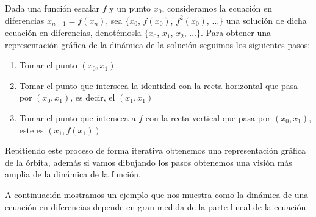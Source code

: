 \documentclass[12pt,a4paper]{report}
\theoremstyle{definition}
\begin{document}
Dada una función escalar $f$ y un punto $x_0$, consideramos la ecuación en diferencias $x_{n+1} = f(x_n)$, sea $\{ x_0$, $f(x_0)$, $f^2(x_0)$, $\ldots \}$ una solución de dicha ecuación en diferencias, denotémosla $ \{ x_0$, $x_1$, $x_2 $, $\ldots \}$. Para obtener una  representación gráfica de la dinámica de la solución seguimos los siguientes pasos:

\begin{enumerate}
    \item Tomar el punto $(x_0,x_1)$.
    \item Tomar el punto que interseca la identidad con la recta horizontal que pasa por  $(x_0,x_1)$, es decir, el $(x_1,x_1)$
    \item Tomar el punto que interseca a $f$ con la recta vertical que pasa por $(x_0,x_1)$, este es $(x_1,f(x_1))$
\end{enumerate}

Repitiendo este proceso de forma iterativa obtenemos una representación gráfica de la órbita, además si vamos dibujando los pasos obtenemos una visión más amplia de la dinámica de la función.

A continuación mostramos un ejemplo que nos muestra como la dinámica de una ecuación en diferencias depende en gran medida de la parte lineal de la ecuación.
\end{document}
